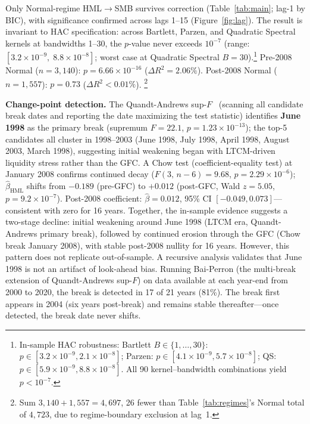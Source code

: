 \documentclass[sigconf,anonymous]{acmart}
\begin{document}
Only Normal-regime HML$\to$SMB survives correction (Table~\ref{tab:main}; lag-1 by BIC), with significance confirmed across lags 1--15 (Figure~\ref{fig:lag}).
The result is invariant to HAC specification: across Bartlett, Parzen, and
Quadratic Spectral kernels at bandwidths 1--30, the $p$-value never exceeds
$10^{-7}$ (range: $[3.2 \times 10^{-9},\; 8.8 \times 10^{-8}]$; worst case
at Quadratic Spectral $B = 30$).\footnote{In-sample HAC robustness:
Bartlett $B \in \{1,\ldots,30\}$: $p \in [3.2 \times 10^{-9}, 2.1 \times 10^{-8}]$;
Parzen: $p \in [4.1 \times 10^{-9}, 5.7 \times 10^{-8}]$;
QS: $p \in [5.9 \times 10^{-9}, 8.8 \times 10^{-8}]$.
All 90 kernel--bandwidth combinations yield $p < 10^{-7}$.}
Pre-2008 Normal ($n = 3{,}140$): $p = 6.66 \times 10^{-16}$ ($\Delta R^2 = 2.06\%$).
Post-2008 Normal ($n = 1{,}557$): $p = 0.73$ ($\Delta R^2 < 0.01\%$).%
\footnote{Sum $3{,}140 + 1{,}557 = 4{,}697$, 26 fewer than
Table~\ref{tab:regimes}'s Normal total of $4{,}723$, due to
regime-boundary exclusion at lag~1.}

\textbf{Change-point detection.}
The Quandt-Andrews sup-$F$~\cite{andrews1993tests} (scanning all
candidate break dates and reporting the date maximizing the test
statistic) identifies \textbf{June 1998}
as the primary break (supremum $F = 22.1$, $p = 1.23 \times 10^{-13}$); the
top-5 candidates all cluster in 1998--2003 (June 1998, July 1998,
April 1998, August 2003, March 1998), suggesting initial weakening
began with LTCM-driven liquidity stress rather than the GFC.
A Chow test (coefficient-equality test) at January 2008 confirms continued
decay ($F(3,\,n-6) = 9.68$, $p = 2.29 \times 10^{-6}$);
$\hat{\beta}_{\text{HML}}$ shifts from $-0.189$ (pre-GFC) to $+0.012$
(post-GFC, Wald $z = 5.05$, $p = 9.2 \times 10^{-7}$).
Post-2008 coefficient: $\hat{\beta} = 0.012$,
95\% CI $[-0.049, 0.073]$---consistent with zero for 16 years.
Together, the in-sample evidence suggests a two-stage decline: initial
weakening around June 1998 (LTCM era, Quandt-Andrews primary break),
followed by continued erosion through the GFC (Chow break January 2008),
with stable post-2008 nullity for 16 years. However, this pattern
does not replicate out-of-sample.
A recursive analysis validates that June 1998 is not an artifact of look-ahead bias.
Running Bai-Perron (the multi-break extension of Quandt-Andrews sup-$F$) on data available at each year-end from 2000 to 2020, the break is detected in 17 of 21 years (81\%).
The break first appears in 2004 (six years post-break) and remains stable thereafter---once detected, the break date never shifts.
\end{document}
